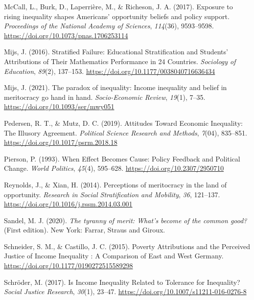 \documentclass[
  12pt,
]{article}
\newlength{\cslhangindent}
\newenvironment{CSLReferences}[2] %
 {\begin{list}{}{%
  \setlength{\itemindent}{0pt}
  \setlength{\leftmargin}{0pt}
  \setlength{\parsep}{0pt}
  \ifodd #1
   \setlength{\leftmargin}{\cslhangindent}
   \setlength{\itemindent}{-1\cslhangindent}
  \fi
  \setlength{\itemsep}{#2\baselineskip}}}
 {\end{list}}
\begin{document}
\begin{CSLReferences}{1}{0}
McCall, L., Burk, D., Laperrière, M., \& Richeson, J. A. (2017).
Exposure to rising inequality shapes {Americans}' opportunity beliefs
and policy support. \emph{Proceedings of the National Academy of
Sciences}, \emph{114}(36), 9593--9598.
\url{https://doi.org/10.1073/pnas.1706253114}

Mijs, J. (2016). Stratified {Failure}: {Educational Stratification} and
{Students}' {Attributions} of {Their Mathematics Performance} in 24
{Countries}. \emph{Sociology of Education}, \emph{89}(2), 137--153.
\url{https://doi.org/10.1177/0038040716636434}

Mijs, J. (2021). The paradox of inequality: Income inequality and belief
in meritocracy go hand in hand. \emph{Socio-Economic Review},
\emph{19}(1), 7--35. \url{https://doi.org/10.1093/ser/mwy051}

Pedersen, R. T., \& Mutz, D. C. (2019). Attitudes {Toward Economic
Inequality}: {The Illusory Agreement}. \emph{Political Science Research
and Methods}, \emph{7}(04), 835--851.
\url{https://doi.org/10.1017/psrm.2018.18}

Pierson, P. (1993). When {Effect Becomes Cause}: {Policy Feedback} and
{Political Change}. \emph{World Politics}, \emph{45}(4), 595--628.
\url{https://doi.org/10.2307/2950710}

Reynolds, J., \& Xian, H. (2014). Perceptions of meritocracy in the land
of opportunity. \emph{Research in Social Stratification and Mobility},
\emph{36}, 121--137. \url{https://doi.org/10.1016/j.rssm.2014.03.001}

Sandel, M. J. (2020). \emph{The tyranny of merit: {What}'s become of the
common good?} (First edition). New York: {Farrar, Straus and Giroux}.

Schneider, S. M., \& Castillo, J. C. (2015). Poverty {Attributions} and
the {Perceived Justice} of {Income Inequality} : {A Comparison} of
{East} and {West Germany}.
\url{https://doi.org/10.1177/0190272515589298}

Schröder, M. (2017). Is {Income Inequality Related} to {Tolerance} for
{Inequality}? \emph{Social Justice Research}, \emph{30}(1), 23--47.
\url{https://doi.org/10.1007/s11211-016-0276-8}


\end{CSLReferences}
\end{document}
